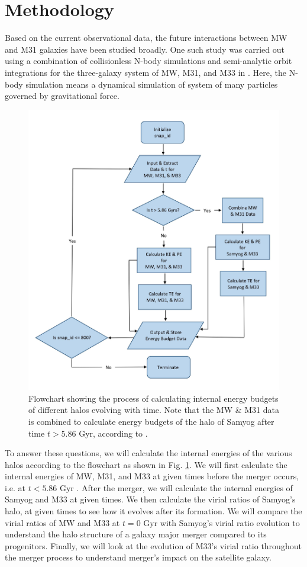 \documentclass[twocolumn]{aastex631}
\begin{document}
\section{Methodology}
\label{sec:method}

Based on the current observational data, the future interactions between MW and M31 galaxies have been studied broadly. One such study was carried out using a combination of collisionless N-body simulations and semi-analytic orbit integrations for the three-galaxy system of MW, M31, and M33 in \cite{simulation}. Here, the N-body simulation means a dynamical simulation of system of many particles governed by gravitational force.

\begin{figure}[htbp]
\includegraphics[width=.5\textwidth]{flowchart.jpg}
\caption{Flowchart showing the process of calculating internal energy budgets of different halos evolving with time. Note that the MW & M31 data is combined to calculate energy budgets of the halo of Samyog after time $t > 5.86$ Gyr, according to \cite{simulation}.
\label{fig:flowchart}}
\end{figure}

To answer these questions, we will calculate the internal energies of the various halos according to the flowchart as shown in Fig. \ref{fig:flowchart}. We will first calculate the internal energies of MW, M31, and M33 at given times before the merger occurs, i.e. at $t < 5.86$ Gyr \citep[see][]{simulation}. After the merger, we will calculate the internal energies of Samyog and M33 at given times. We then calculate the virial ratios of Samyog's halo, at given times to see how it evolves after its formation. We will compare the virial ratios of MW and M33 at $t=0$ Gyr with Samyog's virial ratio evolution to understand the halo structure of a galaxy major merger compared to its progenitors. Finally, we will look at the evolution of M33's virial ratio throughout the merger process to understand merger's impact on the satellite galaxy. 
\end{document}
